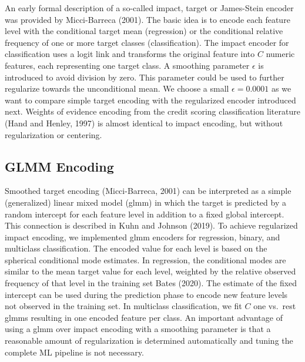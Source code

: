 \documentclass[smallextended]{svjour3}       %
\begin{document}
An early formal description of a so-called impact, target or James-Stein encoder was provided by Micci-Barreca (2001).
The basic idea is to encode each feature level with the conditional target mean (regression) or the conditional relative frequency of one or more target classes (classification).
The impact encoder for classification uses a logit link and transforms the original feature into \(C\) numeric features, each representing one target class.
A smoothing parameter \(\epsilon\) is introduced to avoid division by zero.
This parameter could be used to further regularize towards the unconditional mean.
We choose a small \(\epsilon = 0.0001\) as we want to compare simple target encoding with the regularized encoder introduced next.
Weights of evidence encoding from the credit scoring classification literature (Hand and Henley, 1997) is almost identical to impact encoding, but without regularization or centering.

\hypertarget{glmm-encoding}{%
\subsection{GLMM Encoding}\label{glmm-encoding}}

Smoothed target encoding (Micci-Barreca, 2001) can be interpreted as a simple (generalized) linear mixed model (glmm) in which the target is predicted by a random intercept for each feature level in addition to a fixed global intercept.
This connection is described in Kuhn and Johnson (2019).
To achieve regularized impact encoding, we implemented glmm encoders for regression, binary, and multiclass classification.
The encoded value for each level is based on the spherical conditional mode estimates.
In regression, the conditional modes are similar to the mean target value for each level, weighted by the relative observed frequency of that level in the training set Bates (2020).
The estimate of the fixed intercept can be used during the prediction phase to encode new feature levels not observed in the training set.
In multiclass classification, we fit \(C\) one vs.~rest glmms resulting in one encoded feature per class.
An important advantage of using a glmm over impact encoding with a smoothing parameter is that a reasonable amount of regularization is determined automatically and tuning the complete ML pipeline is not necessary.
\end{document}
